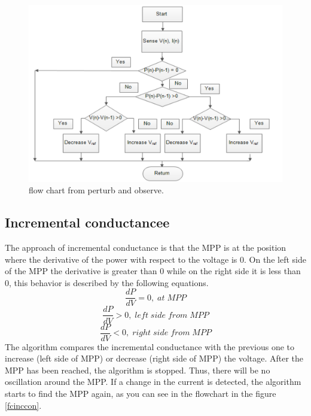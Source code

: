 \begin{figure}[htbp]
	\begin{center}
		\includegraphics[width=1\textwidth]{../Pictures/P1/Flow_chart/flow_chart_perturb_observe}
		\caption{flow chart from perturb and observe\cite{PerturbObserveFC}.}
		\label{fcperturbandobserve}
	\end{center}	
\end{figure}

\subsection{Incremental conductancee}
The approach of incremental conductance is that the MPP is at the position where the derivative of the power with respect to the voltage is 0. On the left side of the MPP the derivative is greater than 0 while on the right side it is less than 0, this behavior is described by the following equations.
\begin{equation} \label{Inccond1}
\frac{dP}{dV} = 0 ,\; at\; MPP 
\end{equation} 
\begin{equation} \label{Inccond2}
\frac{dP}{dV} > 0 ,\; left\; side\; from\; MPP 
\end{equation}
\begin{equation} \label{Inccond3}
\frac{dP}{dV} < 0 ,\; right\; side\; from\; MPP
\end{equation}
The algorithm compares the incremental conductance with the previous one to increase (left side of MPP) or decrease (right side of MPP) the voltage. After the MPP has been reached, the algorithm is stopped. Thus, there will be no oscillation around the MPP. If a change in the current is detected, the algorithm starts to find the MPP again, as you can see in the flowchart in the figure \ref{fcinccon}\cite{AN1521_MC}.

